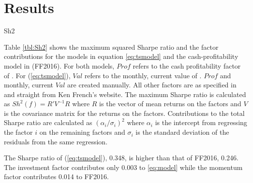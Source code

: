 
\section{Results} \label{sec:results}

{Sh2}

Table \ref{tbl:Sh2} shows the maximum squared Sharpe ratio and the factor contributions for 
the models in equation \ref{eq:tsmodel} and the cash-profitability model in 
\textcite{fama2016choosing} (FF2016).
For both models, $Prof$ refers to the cash profitability factor of \textcite{ball2016accruals}.
For (\ref{eq:tsmodel}), $Val$ refers to the monthly, current value of 
\textcite{asness2013devil}.
$Prof$ and monthly, current $Val$ are created manually.
All other factors are as specified in \textcite{fama2016dissecting} and straight from Ken 
French's 
website.
The maximum Sharpe ratio is calculated as $Sh^2(f)=R'V^{-1}R$ where $R$ is the vector of mean 
returns on the factors and $V$ is the covariance matrix for the returns on the factors.
Contributions to the total Sharpe ratio are calculated as $(\alpha_i / \sigma_i)^2$ where 
$\alpha_i$ is the intercept from regressing the factor $i$ on the remaining factors and 
$\sigma_i$ is the standard deviation of the residuals from the same regression.

The Sharpe ratio of (\ref{eq:tsmodel}), 0.348, is higher than that of FF2016, 0.246.
The investment factor contributes only 0.003 to \ref{eq:model} while the momentum factor 
contributes 0.014 to FF2016.
